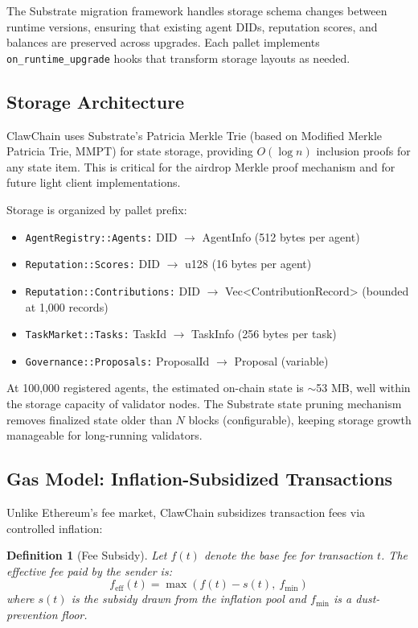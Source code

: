 \documentclass[conference]{IEEEtran}
\newtheorem{definition}{Definition}
\begin{document}
The Substrate migration framework handles storage schema changes between runtime versions, ensuring that existing agent DIDs, reputation scores, and balances are preserved across upgrades. Each pallet implements \texttt{on\_runtime\_upgrade} hooks that transform storage layouts as needed.

\subsection{Storage Architecture}

ClawChain uses Substrate's Patricia Merkle Trie (based on Modified Merkle Patricia Trie, MMPT) for state storage, providing $O(\log n)$ inclusion proofs for any state item. This is critical for the airdrop Merkle proof mechanism and for future light client implementations.

Storage is organized by pallet prefix:

\begin{itemize}
    \item \texttt{AgentRegistry::Agents:} DID $\rightarrow$ AgentInfo (512 bytes per agent)
    \item \texttt{Reputation::Scores:} DID $\rightarrow$ u128 (16 bytes per agent)
    \item \texttt{Reputation::Contributions:} DID $\rightarrow$ Vec<ContributionRecord> (bounded at 1,000 records)
    \item \texttt{TaskMarket::Tasks:} TaskId $\rightarrow$ TaskInfo (256 bytes per task)
    \item \texttt{Governance::Proposals:} ProposalId $\rightarrow$ Proposal (variable)
\end{itemize}

At 100,000 registered agents, the estimated on-chain state is $\sim$53 MB, well within the storage capacity of validator nodes. The Substrate state pruning mechanism removes finalized state older than $N$ blocks (configurable), keeping storage growth manageable for long-running validators.

\subsection{Gas Model: Inflation-Subsidized Transactions}

Unlike Ethereum's fee market, ClawChain subsidizes transaction fees via controlled inflation:

\begin{definition}[Fee Subsidy]
Let $f(t)$ denote the base fee for transaction $t$. The effective fee paid by the sender is:
\begin{equation}
    f_{\text{eff}}(t) = \max\left(f(t) - s(t),\ f_{\min}\right)
\end{equation}
where $s(t)$ is the subsidy drawn from the inflation pool and $f_{\min}$ is a dust-prevention floor.
\end{definition}
\end{document}
